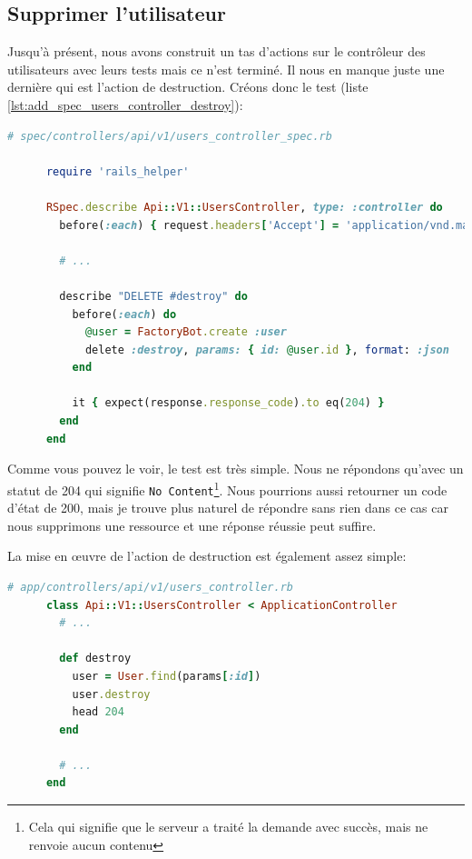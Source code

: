 \documentclass[]{report}
\begin{document}
    \subsection{Supprimer l'utilisateur}

      Jusqu'à présent, nous avons construit un tas d'actions sur le contrôleur des utilisateurs avec leurs tests mais ce n'est terminé. Il nous en manque juste une dernière qui est l'action de destruction. Créons donc le test (liste \ref{lst:add_spec_users_controller_destroy}):

      \begin{scriptsize}
      \begin{lstlisting}[language=ruby, caption={Les tests du contrôlleur utilisateur avec les test de destruction}, label={lst:add_spec_users_controller_destroy}]
      # spec/controllers/api/v1/users_controller_spec.rb

      require 'rails_helper'

      RSpec.describe Api::V1::UsersController, type: :controller do
        before(:each) { request.headers['Accept'] = 'application/vnd.marketplace.v1' }

        # ...

        describe "DELETE #destroy" do
          before(:each) do
            @user = FactoryBot.create :user
            delete :destroy, params: { id: @user.id }, format: :json
          end

          it { expect(response.response_code).to eq(204) }
        end
      end
      \end{lstlisting}
      \end{scriptsize}

      Comme vous pouvez le voir, le test est très simple. Nous ne répondons qu'avec un statut de 204 qui signifie \verb|No Content|\footnote{Cela qui signifie que le serveur a traité la demande avec succès, mais ne renvoie aucun contenu}. Nous pourrions aussi retourner un code d'état de 200, mais je trouve plus naturel de répondre sans rien dans ce cas car nous supprimons une ressource et une réponse réussie peut suffire.

      La mise en œuvre de l'action de destruction est également assez simple:

      \begin{scriptsize}
      \begin{lstlisting}[language=ruby]
      # app/controllers/api/v1/users_controller.rb
      class Api::V1::UsersController < ApplicationController
        # ...

        def destroy
          user = User.find(params[:id])
          user.destroy
          head 204
        end

        # ...
      end
      \end{lstlisting}
      \end{scriptsize}
\end{document}
